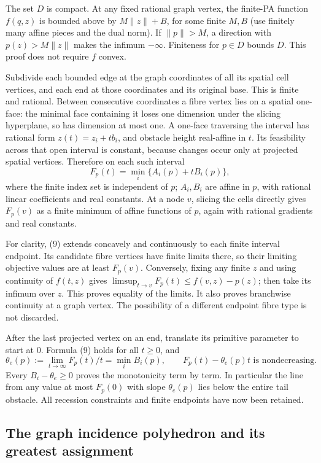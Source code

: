 \documentclass[
  11pt,
]{article}
\begin{document}
The set \(D\) is compact. At any fixed rational graph vertex, the
finite-PA function \(f(q,z)\) is bounded above by \(M\|z\|+B\), for some
finite \(M,B\) (use finitely many affine pieces and the dual norm). If
\(\|p\|>M\), a direction with \(p(z)>M\|z\|\) makes the infimum
\(-\infty\). Finiteness for \(p\in D\) bounds \(D\). This proof does not
require \(f\) convex.

Subdivide each bounded edge at the graph coordinates of all its spatial
cell vertices, and each end at those coordinates and its original base.
This is finite and rational. Between consecutive coordinates a fibre
vertex lies on a spatial one-face: the minimal face containing it loses
one dimension under the slicing hyperplane, so has dimension at most
one. A one-face traversing the interval has rational form
\(z(t)=z_i+t b_i\), and obstacle height real-affine in \(t\). Its
feasibility across that open interval is constant, because changes occur
only at projected spatial vertices. Therefore on each such interval \[
 F_p(t)=\min_i\{A_i(p)+t B_i(p)\},                      \tag{9}
\] where the finite index set is independent of \(p\); \(A_i,B_i\) are
affine in \(p\), with rational linear coefficients and real constants.
At a node \(v\), slicing the cells directly gives \(F_p(v)\) as a finite
minimum of affine functions of \(p\), again with rational gradients and
real constants.

For clarity, (9) extends concavely and continuously to each finite
interval endpoint. Its candidate fibre vertices have finite limits
there, so their limiting objective values are at least \(F_p(v)\).
Conversely, fixing any finite \(z\) and using continuity of \(f(t,z)\)
gives \(\limsup_{t\to v}F_p(t)\leq f(v,z)-p(z)\); then take its infimum
over \(z\). This proves equality of the limits. It also proves
branchwise continuity at a graph vertex. The possibility of a different
endpoint fibre type is not discarded.

After the last projected vertex on an end, translate its primitive
parameter to start at 0. Formula (9) holds for all \(t\geq0\), and \[
 \theta_e(p):=\lim_{t\to\infty}F_p(t)/t=\min_i B_i(p),\qquad
 F_p(t)-\theta_e(p)t\text{ is nondecreasing}.             \tag{10}
\] Every \(B_i-\theta_e\geq0\) proves the monotonicity term by term. In
particular the line from any value at most \(F_p(0)\) with slope
\(\theta_e(p)\) lies below the entire tail obstacle. All recession
constraints and finite endpoints have now been retained.

\subsection{The graph incidence polyhedron and its greatest
assignment}\label{the-graph-incidence-polyhedron-and-its-greatest-assignment}
\end{document}
